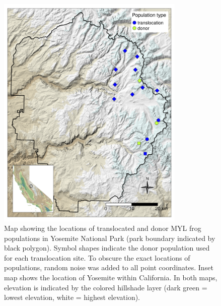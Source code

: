 \documentclass[9pt,twoside,lineno]{pnas-new}
\begin{document}
\begin{figure}

{\centering \includegraphics[width=0.8\textwidth]{figures/map_translocation_points.png}

}

\caption{\label{fig-yosemap}Map showing the locations of translocated
and donor MYL frog populations in Yosemite National Park (park boundary
indicated by black polygon). Symbol shapes indicate the donor population
used for each translocation site. To obscure the exact locations of
populations, random noise was added to all point coordinates. Inset map
shows the location of Yosemite within California. In both maps,
elevation is indicated by the colored hillshade layer (dark green =
lowest elevation, white = highest elevation). }

\end{figure}\clearpage
\end{document}
